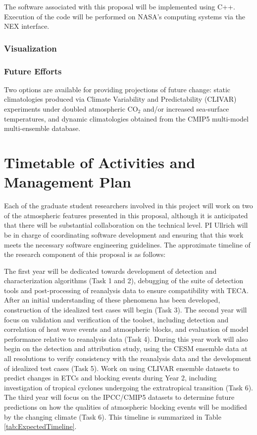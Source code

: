 \documentclass[11pt]{article}
\begin{document}
The software associated with this proposal will be implemented using C++.  Execution of the code will be performed on NASA's computing systems via the NEX interface.

\subsubsection{Visualization}

\subsubsection{Future Efforts}

Two options are available for providing projections of future change: static climatologies produced via Climate Variability and Predictability (CLIVAR) experiments under doubled atmospheric CO$_2$ and/or increased sea-surface temperatures, and dynamic climatologies obtained from the CMIP5 multi-model multi-ensemble database.

\section{Timetable of Activities and Management Plan} \label{sec:Timeline}

Each of the graduate student researchers involved in this project will work on two of the atmospheric features presented in this proposal, although it is anticipated that there will be substantial collaboration on the technical level.  PI Ullrich will be in charge of coordinating software development and ensuring that this work meets the necessary software engineering guidelines.  The approximate timeline of the research component of this proposal is as follows:

The first year will be dedicated towards development of detection and characterization algorithms (Task 1 and 2), debugging of the suite of detection tools and post-processing of reanalysis data to ensure compatibility with TECA.  After an initial understanding of these phenomena has been developed, construction of the idealized test cases will begin (Task 3).  The second year will focus on validation and verification of the toolset, including detection and correlation of heat wave events and atmospheric blocks, and evaluation of model performance relative to reanalysis data (Task 4).  During this year work will also begin on the detection and attribution study, using the CESM ensemble data at all resolutions to verify consistency with the reanalysis data and the development of idealized test cases (Task 5).  Work on using CLIVAR ensemble datasets to predict changes in ETCs and blocking events during Year 2, including investigation of tropical cyclones undergoing the extratropical transition (Task 6).  The third year will focus on the IPCC/CMIP5 datasets to determine future predictions on how the qualities of atmospheric blocking events will be modified by the changing climate (Task  6).  This timeline is summarized in Table \ref{tab:ExpectedTimeline}.
\end{document}
